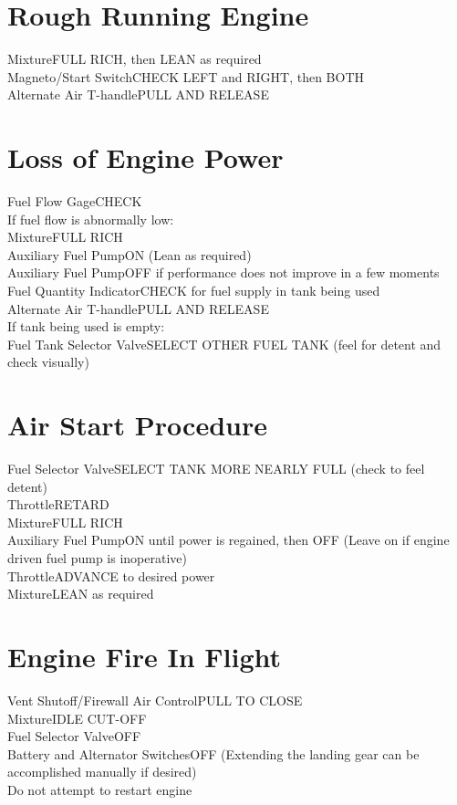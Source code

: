 \documentclass{article}
\begin{document}
\begin{multicols*}{2}
\section*{Rough Running Engine}
Mixture\dotfill FULL RICH, then LEAN as required\\
Magneto/Start Switch\dotfill CHECK LEFT and RIGHT, then BOTH\\
Alternate Air T-handle\dotfill PULL AND RELEASE
\section*{Loss of Engine Power}
Fuel Flow Gage\dotfill CHECK\\
If fuel flow is abnormally low:\\
\hspace*{6mm} Mixture\dotfill FULL RICH\\
\hspace*{6mm} Auxiliary Fuel Pump\dotfill ON (Lean as required)\\
\hspace*{6mm} Auxiliary Fuel Pump\dotfill OFF if performance does not improve in a few moments\\
Fuel Quantity Indicator\dotfill CHECK for fuel supply in tank being used\\
Alternate Air T-handle\dotfill PULL AND RELEASE\\
If tank being used is empty:\\
\hspace*{6mm} Fuel Tank Selector Valve\dotfill SELECT OTHER FUEL TANK (feel for detent and check visually)
\section*{Air Start Procedure}
Fuel Selector Valve\dotfill SELECT TANK MORE NEARLY FULL (check to feel detent)\\
Throttle\dotfill RETARD\\
Mixture\dotfill FULL RICH\\
Auxiliary Fuel Pump\dotfill ON until power is regained, then OFF (Leave on if engine driven fuel pump is inoperative)\\
Throttle\dotfill ADVANCE to desired power\\
Mixture\dotfill LEAN as required
\vfill\null
\section*{Engine Fire In Flight}
Vent Shutoff/Firewall Air Control\dotfill PULL TO CLOSE\\
Mixture\dotfill IDLE CUT-OFF\\
Fuel Selector Valve\dotfill OFF\\
Battery and Alternator Switches\dotfill OFF (Extending the landing gear can be accomplished manually if desired)\\
Do not attempt to restart engine

\end{multicols*}
\end{document}
